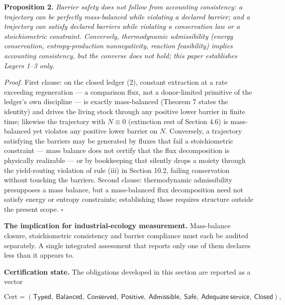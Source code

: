 \documentclass[11pt]{article}
\begin{document}
\textbf{Proposition 2.} \emph{Barrier safety does not follow from accounting consistency: a trajectory can be perfectly mass-balanced while violating a declared barrier; and a trajectory can satisfy declared barriers while violating a conservation law or a stoichiometric constraint. Conversely, thermodynamic admissibility (energy conservation, entropy-production nonnegativity, reaction feasibility) implies accounting consistency, but the converse does not hold; this paper establishes Layers 1--3 only.}

\emph{Proof.} First clause: on the closed ledger (2), constant extraction at a rate exceeding regeneration --- a comparison flux, not a donor-limited primitive of the ledger's own discipline --- is exactly mass-balanced (Theorem 7 states the identity) and drives the living stock through any positive lower barrier in finite time; likewise the trajectory with \(N \equiv 0\) (extinction rest of Section 4.6) is mass-balanced yet violates any positive lower barrier on \(N\). Conversely, a trajectory satisfying the barriers may be generated by fluxes that fail a stoichiometric constraint --- mass balance does not certify that the flux decomposition is physically realizable --- or by bookkeeping that silently drops a moiety through the yield-routing violation of rule (iii) in Section 10.2, failing conservation without touching the barriers. Second clause: thermodynamic admissibility presupposes a mass balance, but a mass-balanced flux decomposition need not satisfy energy or entropy constraints; establishing those requires structure outside the present scope. \(\square\)

\textbf{The implication for industrial-ecology measurement.} Mass-balance closure, stoichiometric consistency and barrier compliance must each be audited separately. A single integrated assessment that reports only one of them declares less than it appears to.

\textbf{Certification state.} The obligations developed in this section are reported as a vector 

$$\mathrm{Cert}=(\mathsf{Typed},\ \mathsf{Balanced},\ \mathsf{Conserved},\ \mathsf{Positive},\ \mathsf{Admissible},\ \mathsf{Safe},\ \mathsf{Adequate\ service},\ \mathsf{Closed}),$$
\end{document}
